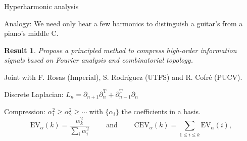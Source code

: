 \documentclass[10pt,t, handout]{beamer} %
\newtheorem{result}{Result}
\begin{document}
\begin{frame}{Hyperharmonic analysis}
	\vskip -5pt
	
	\textcolor{pblue}{Analogy:} We need only hear a few harmonics to distinguish a guitar's from a piano's middle C.
	
	\vskip 5pt
	\pause
	
	\begin{result}
		Propose a principled method to compress high-order information signals based on Fourier analysis and combinatorial topology.
	\end{result}

	Joint with F. Rosas (Imperial), S. Rodr\'iguez (UTFS) and R. Cofr\'e (PUCV). 
	
	\vskip 15pt
	\pause
	
	\textcolor{pblue}{Discrete Laplacian:} $\displaystyle{L_n = \partial_{n+1} \partial_{n}^{\mathrm T} + \partial_{n-1}^{\mathrm T} \partial_{n}}$
	
	\vskip 15pt
	\pause
	
	\textcolor{pblue}{Compression:} $\alpha_1^2 \geq \alpha_2^2 \geq \cdots$ with $\{\alpha_i\}$ the coefficients in a basis.
	\begin{equation*}
	\text{EV}_{\alpha}(k) = \frac{ \alpha_k^2}{{\displaystyle \sum_{i} \alpha_i^2}}
	\qquad \text{ and } \qquad
	\text{CEV}_{\alpha}(k) = \sum_{1\leq i \leq k} \text{EV}_{\alpha}(i),
	\end{equation*}
\end{frame}
\end{document}
